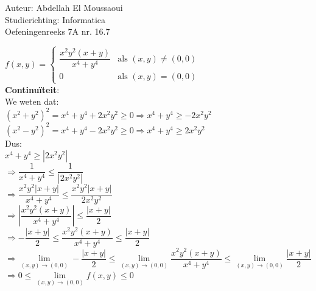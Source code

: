 \documentclass[a4paper]{article}
\begin{document}
  
\noindent \large Auteur: Abdellah El Moussaoui \\
\noindent \large Studierichting: Informatica\\
\noindent \large Oefeningenreeks 7A nr. 16.7\\

\medskip

\normalsize

$f(x,y) = 
\left\{ 
\begin{array}{ll} 
\dfrac{x^2y^2(x+y)}{x^4+y^4} & \text{als } (x,y) \neq (0,0)\\[2ex] 
0 & \text{als } (x,y) = (0,0) 
\end{array} 
\right.$ \\

\textbf{Continuïteit}:\\

We weten dat:\\

$\left(x^2+y^2\right)^2 = x^4+y^4+2x^2y^2 \geq 0 \Rightarrow x^4+y^4\geq -2x^2y^2$\\

$\left(x^2-y^2\right)^2 = x^4+y^4-2x^2y^2 \geq 0 \Rightarrow x^4+y^4\geq 2x^2y^2$\\

Dus:\\

$x^4+y^4\geq \left|2x^2y^2\right|$\\

$\Rightarrow \dfrac{1}{x^4+y^4} \leq \dfrac{1}{\left|2x^2y^2\right|}$\\

$\Rightarrow \dfrac{x^2y^2\left| x+y \right|}{x^4+y^4} \leq \dfrac{x^2y^2\left| x+y \right|}{2x^2y^2}$\\

$\Rightarrow\left |\dfrac{x^2y^2\left( x+y \right)}{x^4+y^4} \right | \leq \dfrac{\left| x+y \right|}{2}$\\

$\Rightarrow -\dfrac{\left| x+y \right|}{2} \leq \dfrac{x^2y^2\left( x+y \right)}{x^4+y^4} \leq \dfrac{\left| x+y \right|}{2}$\\

$\Rightarrow \lim\limits_{(x,y)\rightarrow (0,0)}-\dfrac{\left| x+y \right|}{2} \leq \lim\limits_{(x,y)\rightarrow (0,0)} \dfrac{x^2y^2\left( x+y \right)}{x^4+y^4} \leq \lim\limits_{(x,y)\rightarrow (0,0)} \dfrac{\left| x+y \right|}{2}$\\

$\Rightarrow 0 \leq \lim\limits_{(x,y)\rightarrow (0,0)} f(x,y) \leq 0$\\
\end{document}
